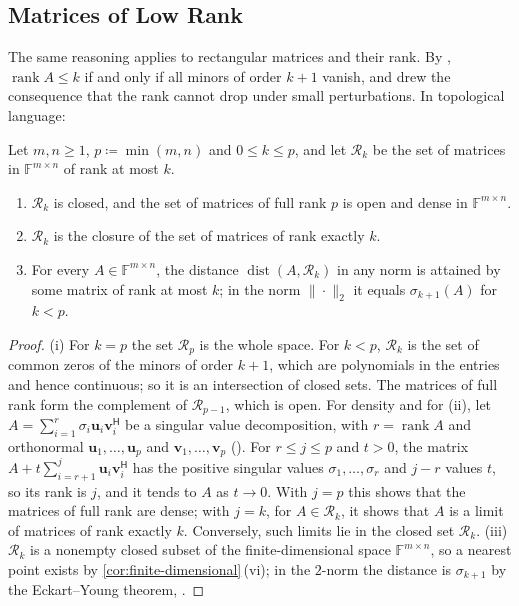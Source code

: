 \subsection{Matrices of Low Rank}

The same reasoning applies to rectangular matrices and their rank. By , $\operatorname{rank}A\le k$ if and only if all minors of order $k+1$ vanish, and  drew the consequence that the rank cannot drop under small perturbations. In topological language:

\begin{proposition}
\label{prop:rank-sets}
Let $m,n\ge1$, $p\coloneqq\min(m,n)$ and $0\le k\le p$, and let $\mathcal R_k$ be the set of matrices in $\mathbb F^{m\times n}$ of rank at most $k$.
\begin{enumerate}
\item $\mathcal R_k$ is closed, and the set of matrices of full rank $p$ is open and dense in $\mathbb F^{m\times n}$.
\item $\mathcal R_k$ is the closure of the set of matrices of rank exactly $k$.
\item For every $A\in\mathbb F^{m\times n}$, the distance $\operatorname{dist}(A,\mathcal R_k)$ in any norm is attained by some matrix of rank at most $k$; in the norm $\|\cdot\|_2$ it equals $\sigma_{k+1}(A)$ for $k<p$.
\end{enumerate}
\end{proposition}

\begin{proof}
(i) For $k=p$ the set $\mathcal R_p$ is the whole space. For $k<p$, $\mathcal R_k$ is the set of common zeros of the minors of order $k+1$, which are polynomials in the entries and hence continuous; so it is an intersection of closed sets. The matrices of full rank form the complement of $\mathcal R_{p-1}$, which is open. For density and for (ii), let $A=\sum_{i=1}^r\sigma_i\mathbf u_i\mathbf v_i^{\mathsf H}$ be a singular value decomposition, with $r=\operatorname{rank}A$ and orthonormal $\mathbf u_1,\ldots,\mathbf u_p$ and $\mathbf v_1,\ldots,\mathbf v_p$ (). For $r\le j\le p$ and $t>0$, the matrix $A+t\sum_{i=r+1}^j\mathbf u_i\mathbf v_i^{\mathsf H}$ has the positive singular values $\sigma_1,\ldots,\sigma_r$ and $j-r$ values $t$, so its rank is $j$, and it tends to $A$ as $t\to0$. With $j=p$ this shows that the matrices of full rank are dense; with $j=k$, for $A\in\mathcal R_k$, it shows that $A$ is a limit of matrices of rank exactly $k$. Conversely, such limits lie in the closed set $\mathcal R_k$. (iii) $\mathcal R_k$ is a nonempty closed subset of the finite-dimensional space $\mathbb F^{m\times n}$, so a nearest point exists by \cref{cor:finite-dimensional}\,(vi); in the $2$-norm the distance is $\sigma_{k+1}$ by the Eckart--Young theorem, .
\end{proof}

